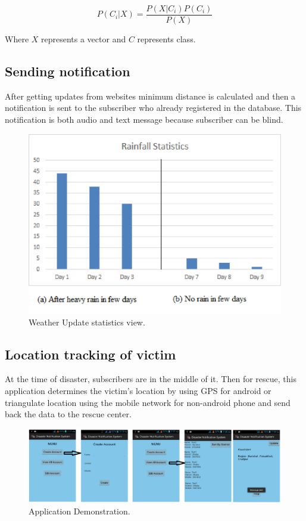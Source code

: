 \documentclass[conference]{IEEEtran}
\begin{document}
\begin{equation}
P(C_i|X) = \frac{P(X|C_i)P(C_i)}{P(X)}
\label{eq:naive}
\end{equation}

Where $X$ represents a vector and $C$ represents class.

\subsection{Sending notification}
After getting updates from websites minimum distance is calculated and then a notification is sent to the subscriber who already registered in the database. This notification is both audio and text message because subscriber can be blind.


\begin{figure}[htp]
	\centering
		\includegraphics[width=.49\textwidth]{fig/floodjs.eps}
	\caption{ Weather Update statistics view.  }
	\label{Figure:rainfall}
\end{figure}



\subsection{Location tracking of victim}
At the time of disaster, subscribers are in the middle of it. Then for rescue, this application determines the victim’s location by using GPS for android or triangulate location using the mobile network for non-android phone and send back the data to the rescue center.




\begin{figure}[htp]
	\centering
		\includegraphics[width=.95\textwidth]{fig/scrnn.eps}
	\caption{ Application Demonstration. }
	\label{Figure:application}
\end{figure}
\end{document}
